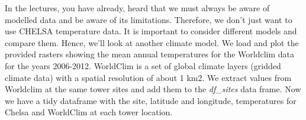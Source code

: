 \documentclass[
]{book}
\newenvironment{Shaded}{\begin{snugshade}}{\end{snugshade}}
\newcommand{\DataTypeTok}[1]{\textcolor[rgb]{0.13,0.29,0.53}{#1}}
\newcommand{\FloatTok}[1]{\textcolor[rgb]{0.00,0.00,0.81}{#1}}
\newcommand{\KeywordTok}[1]{\textcolor[rgb]{0.13,0.29,0.53}{\textbf{#1}}}
\newcommand{\NormalTok}[1]{#1}
\newcommand{\OperatorTok}[1]{\textcolor[rgb]{0.81,0.36,0.00}{\textbf{#1}}}
\newcommand{\OtherTok}[1]{\textcolor[rgb]{0.56,0.35,0.01}{#1}}
\newcommand{\StringTok}[1]{\textcolor[rgb]{0.31,0.60,0.02}{#1}}
\begin{document}
\begin{Shaded}
\end{Shaded}

In the lectures, you have already, heard that we must always be aware of modelled data and be aware of its limitations. Therefore, we don't just want to use CHELSA temperature data. It is important to consider different models and compare them. Hence, we'll look at another climate model. We load and plot the provided rasters showing the mean annual temperatures for the Worldclim data for the years 2006-2012. WorldClim is a set of global climate layers (gridded climate data) with a spatial resolution of about 1 km2. We extract values from Worldclim at the same tower sites and add them to the \emph{df\_sites} data frame. Now we have a tidy dataframe with the site, latitude and longitude, temperatures for Chelsa and WorldClim at each tower location.

\begin{Shaded}
\end{Shaded}
\end{document}
